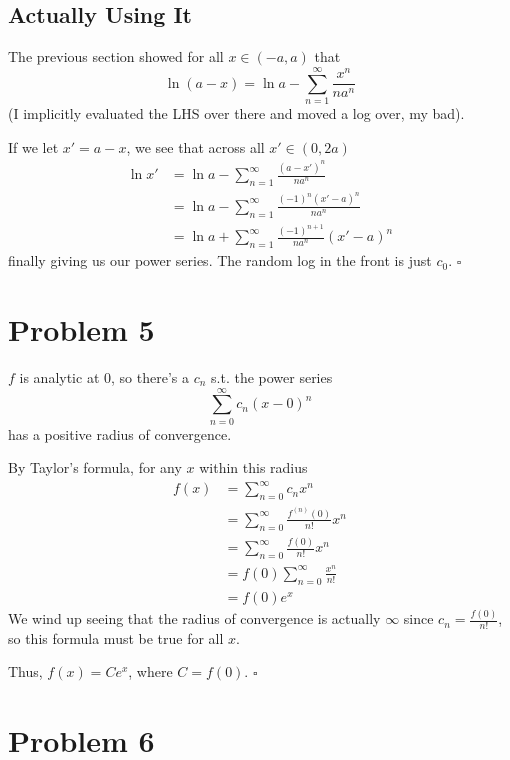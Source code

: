 \documentclass[12pt]{article}
\begin{document}
\subsection{Actually Using It}

The previous section showed for all $x \in (-a, a)$ that
\[\ln(a-x) = \ln a -\sum_{n=1}^{\infty} \frac{x^n}{na^n}\]
(I implicitly evaluated the LHS over there and moved a log over, my bad).

If we let $x'=a-x$, we see that across all $x' \in (0, 2a)$
\begin{align*}
    \ln x'
     & = \ln a - \sum_{n=1}^{\infty} \frac{(a-x')^n}{na^n}           \\
     & = \ln a - \sum_{n=1}^{\infty} \frac{(-1)^n(x'-a)^n}{na^n}     \\
     & = \ln a + \sum_{n=1}^{\infty} \frac{(-1)^{n+1}}{na^n}(x'-a)^n
\end{align*}
finally giving us our power series.
The random log in the front is just $c_0$. $\square$

\pagebreak

\section{Problem 5}

$f$ is analytic at $0$, so there's a $c_n$ s.t. the power series
\[\sum_{n=0}^{\infty} c_n(x-0)^n\]
has a positive radius of convergence.

By Taylor's formula, for any $x$ within this radius
\begin{align*}
    f(x)
     & = \sum_{n=0}^{\infty} c_n x^n                   \\
     & = \sum_{n=0}^{\infty} \frac{f^{(n)}(0)}{n!} x^n \\
     & = \sum_{n=0}^{\infty} \frac{f(0)}{n!}x^n        \\
     & = f(0) \sum_{n=0}^{\infty} \frac{x^n}{n!}       \\
     & = f(0) e^x
\end{align*}
We wind up seeing that the radius of convergence is actually $\infty$
since $c_n=\frac{f(0)}{n!}$, so this formula must be true for all $x$.

Thus, $f(x)=Ce^x$, where $C=f(0)$. $\square$

\pagebreak

\section{Problem 6}
\end{document}
